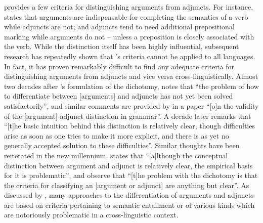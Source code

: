 \cite{tesniere:1959} provides a few criteria for distinguishing arguments from adjuncts. For instance, \cite[128]{tesniere:1959} states that arguments are indispensable for completing the semantics of a verb while adjuncts are not; and adjuncts tend to need additional prepositional marking while arguments do not – unless a preposition is closely associated with the verb. While the distinction itself has been highly influential, subsequent research has repeatedly shown that \citeauthor{tesniere:1959}’s criteria cannot be applied to all languages. In fact, it has proven remarkably difficult to find any adequate criteria for distinguishing arguments from adjuncts and vice versa cross-linguistically. Almost two decades after \citeauthor{tesniere:1959}’s formulation of the dichotomy, \cite[21]{vater:1978} notes that “the problem of how to differentiate between [arguments] and adjuncts has not yet been solved satisfactorily”, and similar comments are provided by \cite{somers:1984} in a paper “[o]n the validity of the [argument]-adjunct distinction in  grammar”. A decade later \cite[906]{comrie:1993} remarks that “[t]he basic intuition behind this distinction is relatively clear, though difficulties arise as soon as one tries to make it more explicit, and there is as yet no generally accepted solution to these difficulties”. Similar thoughts have been reiterated in the new millennium. \cite[30]{farrell:2005} states that “[a]lthough the conceptual distinction between argument and adjunct is relatively clear, the empirical basis for it is problematic”, and \cite[165]{rickheit:sichelschmidt:2007} observe that “[t]he problem with the dichotomy is that the criteria for classifying an [argument or adjunct] are anything but clear”. As discussed by \cite[46ff.]{haspelmath:hartmann:2015}, many approaches to the differentiation of arguments and adjuncts are based on criteria pertaining to semantic entailment or  of various kinds which are notoriously problematic in a cross-linguistic context.

